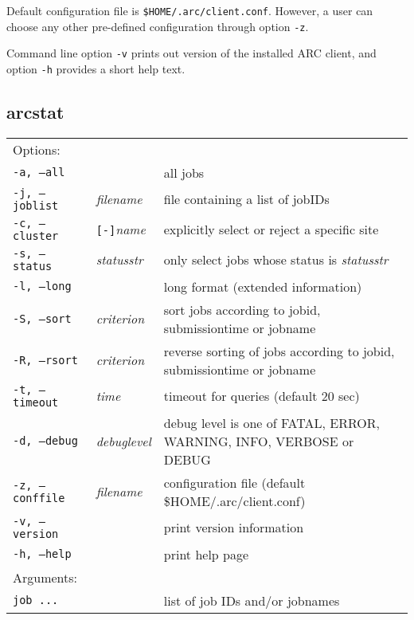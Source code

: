 Default configuration file is \texttt{{\$}HOME/.arc/client.conf}. However, a user can choose any
other pre-defined configuration through option \verb#-z#.

Command line option \verb#-v# prints out version of the installed ARC client, and option
\verb#-h# provides a short help text.


\subsection{arcstat}
\label{sec:arcstat}

\begin{shaded}
\end{shaded}
\begin{longtable}{llp{8cm}}
   Options:&&\\
   \texttt{-a, --all}& & all jobs\\
   \texttt{-j, --joblist}& \textit{filename}& file containing a list of jobIDs\\
   \texttt{-c, --cluster}&\verb#[-]#\textit{name}&explicitly select or reject a specific site\\
   \texttt{-s, --status}& \textit{statusstr} &only select jobs whose status is \textit{statusstr}\\
   \texttt{-l, --long}& & long format (extended information)\\
   \texttt{-S, --sort}& \textit{criterion} & sort jobs according to jobid, submissiontime or jobname\\
   \texttt{-R, --rsort}& \textit{criterion} & reverse sorting of jobs according to jobid, submissiontime or jobname\\

   \texttt{-t, --timeout}& \textit{time}& timeout for queries (default 20 sec)\\
   \texttt{-d, --debug}& \textit{debuglevel}&debug level is one of  FATAL, ERROR, WARNING, INFO, VERBOSE or DEBUG\\
   \texttt{-z, --conffile}&\textit{filename}& configuration file (default {\$}HOME/.arc/client.conf)\\
   \texttt{-v, --version}& & print version information\\
   \texttt{-h, --help}& & print help page\\
   Arguments:&&\\
   \texttt{job ...} && list of job IDs and/or jobnames\\
\end{longtable}

